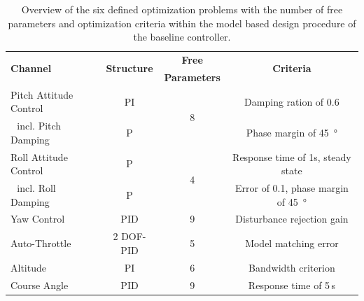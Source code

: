 \documentclass[aerospace,article,submit,moreauthors,pdftex,10pt,a4paper]{Definitions/mdpi}
\begin{document}
\begin{table}[H]
	\caption{Overview of the six defined optimization problems with the number of free parameters and optimization criteria within the model based design procedure of the baseline controller.}
	\centering
	\begin{tabular}{lccc}
		\toprule
		\multirow{2}{*}{\textbf{Channel} } & \multirow{2}{*}{\textbf{Structure} } &    \textbf{Free }    &   \multirow{2}{*}{\textbf{Criteria} }   \\
		&                                      & \textbf{ Parameters} &                                         \\ \midrule
		Pitch Attitude Control             &                  PI                  &  \multirow{2}{*}{8}  &        Damping ration of 0.6          \\
		\,\, incl. Pitch Damping           &                  P                   &                      &         Phase margin of \SI{45}{\degree}         \\
		Roll Attitude Control              &                  P                   &  \multirow{2}{*}{4}  &   Response time of 1s, steady state   \\
		\,\, incl. Roll Damping            &                  P                   &                      & Error of 0.1, phase margin of \SI{45}{\degree} \\
		Yaw Control                        &                 PID                  &          9           &       Disturbance rejection gain        \\
		Auto-Throttle                      &              2 DOF-PID               &          5           &          Model matching error           \\
		Altitude                           &                  PI                  &          6           &           Bandwidth criterion           \\
		Course Angle                       &                 PID                  &          9           &          Response time of 5\,s          \\ \bottomrule
	\end{tabular}\label{tab:opt}
\end{table}
\end{document}
